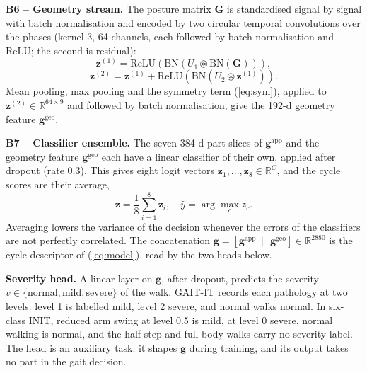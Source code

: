 \documentclass[conference]{IEEEtran}
\begin{document}
\textbf{B6 -- Geometry stream.} The posture matrix $\mathbf{G}$ is standardised signal by signal with batch normalisation and encoded by two circular temporal convolutions over the phases (kernel 3, 64 channels, each followed by batch normalisation and ReLU; the second is residual):
\begin{equation}
\mathbf{z}^{(1)}=\mathrm{ReLU}\left(\mathrm{BN}(U_1\circledast\mathrm{BN}(\mathbf{G}))\right),
\end{equation}
\begin{equation}
\mathbf{z}^{(2)}=\mathbf{z}^{(1)}+\mathrm{ReLU}\left(\mathrm{BN}(U_2\circledast\mathbf{z}^{(1)})\right).
\label{eq:geo}
\end{equation}
Mean pooling, max pooling and the symmetry term (\ref{eq:sym}), applied to $\mathbf{z}^{(2)}\in\mathbb{R}^{64\times9}$ and followed by batch normalisation, give the 192-d geometry feature $\mathbf{g}^{\mathrm{geo}}$.

\textbf{B7 -- Classifier ensemble.} The seven 384-d part slices of $\mathbf{g}^{\mathrm{app}}$ and the geometry feature $\mathbf{g}^{\mathrm{geo}}$ each have a linear classifier of their own, applied after dropout (rate 0.3). This gives eight logit vectors $\mathbf{z}_1,\dots,\mathbf{z}_8\in\mathbb{R}^{C}$, and the cycle scores are their average,
\begin{equation}
\mathbf{z}=\frac{1}{8}\sum_{i=1}^{8}\mathbf{z}_i,\quad \hat{y}=\arg\max_c z_c.
\label{eq:avg}
\end{equation}
Averaging lowers the variance of the decision whenever the errors of the classifiers are not perfectly correlated. The concatenation $\mathbf{g}=[\mathbf{g}^{\mathrm{app}}\,\|\,\mathbf{g}^{\mathrm{geo}}]\in\mathbb{R}^{2880}$ is the cycle descriptor of (\ref{eq:model}), read by the two heads below.

\textbf{Severity head.} A linear layer on $\mathbf{g}$, after dropout, predicts the severity $v\in\{\mathrm{normal},\mathrm{mild},\mathrm{severe}\}$ of the walk. GAIT-IT records each pathology at two levels: level 1 is labelled mild, level 2 severe, and normal walks normal. In six-class INIT, reduced arm swing at level 0.5 is mild, at level 0 severe, normal walking is normal, and the half-step and full-body walks carry no severity label. The head is an auxiliary task: it shapes $\mathbf{g}$ during training, and its output takes no part in the gait decision.
\end{document}
